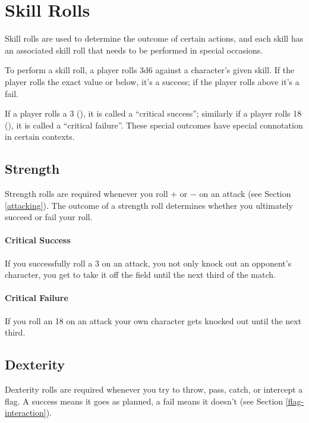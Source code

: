 \section{Skill Rolls}\label{skill-rolls}
Skill rolls are used to determine the outcome of certain actions, and each skill has an associated skill roll that needs to be performed in special occasions.

To perform a skill roll, a player rolls 3d6 against a character's given skill.
If the player rolls the exact value or below, it's a success; if the player rolls above it's a fail.

If a player rolls a 3 (), it is called a ``critical success''; similarly if a player rolls 18 (), it is called a ``critical failure''.
These special outcomes have special connotation in certain contexts.



\subsection{Strength}
Strength rolls are required whenever you roll $+$ or $-$ on an attack (see Section \ref{attacking}).
The outcome of a strength roll determines whether you ultimately succeed or fail your roll.

\paragraph{Critical Success} If you successfully roll a 3 on an attack, you not only knock out an opponent's character, you get to take it off the field until the next third of the match.

\paragraph{Critical Failure} If you roll an 18 on an attack your own character gets knocked out until the next third.
\subsection{Dexterity}
Dexterity rolls are required whenever you try to throw, pass, catch, or intercept a flag.
A success means it goes as planned, a fail means it doesn't (see Section \ref{flag-interaction}).

